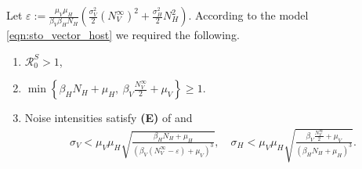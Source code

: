 \begin{assumption} \label{ass:persistence}
    Let
    $
        \displaystyle
        \varepsilon:=
            \frac{\mu_V \mu_H}{\beta_V \beta_H N_H}
                \left(
                    \frac{\sigma_V ^ 2}{2}
                    \left(
                        N_V ^ {\infty}
                    \right) ^ 2
                    +
                    \frac{\sigma_H ^ 2}{2}
                    N_H ^2
                \right)
    $.
    According to the model \eqref{eqn:sto_vector_host} we required the
    following.
    \begin{enumerate}[\bf{(P\textendash}1)]
        \item
            $ \mathcal{R}_0 ^ S > 1$,
             
        \item
        $
            \displaystyle
            \min
            \left\{
                 \beta_H N_H + \mu_H, \ 
                 \beta_V \frac{N_V ^ {\infty}}{2} + \mu_V
            \right\}
            \geq 1.
        $
        \item Noise intensities satisfy 
            \textbf{(E)} of 
            and
            \begin{align*}
                \sigma_V 
                    < \mu_V \mu_H
                    \sqrt{
                        \frac{\beta_H N_H + \mu_H}{
                            \left(
                                \beta_V
                                \left(
                                    N_V ^ {\infty} - \varepsilon
                                \right) 
                                + \mu_V
                            \right)  ^ 3
                        }
                    },
                \quad
                \sigma_H 
                    < \mu_V \mu_H
                    \sqrt{
                        \frac{\beta_V \frac{N_V ^ {\infty}}{2} + \mu_V}{
                            \left(
                                \beta_H N_H + \mu_H
                            \right)  ^ 3
                        }
                    } .
            \end{align*}
    \end{enumerate}
%
\end{assumption}


